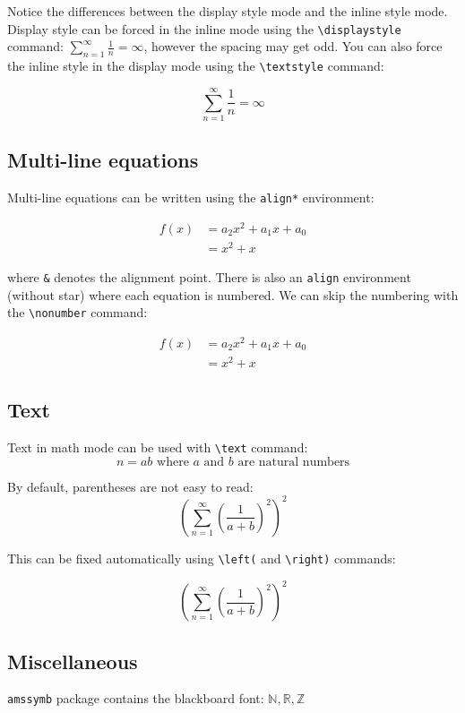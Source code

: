 \documentclass[a4paper]{article}
\newcommand{\sign}[1]{\texttt{\textbackslash{#1}}}
\begin{document}
Notice the differences between the display style mode and the inline style mode. Display style can be forced in the inline mode using the \sign{displaystyle} command: \( \displaystyle \sum_{n=1}^\infty \frac{1}{n} = \infty \), however the spacing may get odd. You can also force the inline style in the display mode using the \sign{textstyle} command:

$$
\textstyle
\sum_{n=1}^\infty \frac{1}{n} = \infty
$$

\subsection{Multi-line equations}

Multi-line equations can be written using the \texttt{align*} environment: 

\begin{align*}
    f(x) & = a_2x^2 + a_1x+ a_0 \\
         & = x^2 + x
\end{align*}

where \texttt{\&} denotes the alignment point. There is also an \texttt{align} environment (without star) where each equation is numbered. We can skip the numbering with the \sign{nonumber} command:

\begin{align}
    f(x) & = a_2x^2 + a_1x+ a_0 \\
         & = x^2 + x \nonumber
\end{align}

\subsection{Text}

Text in math mode can be used with \sign{text\string{\string}} command: 
$$
n = ab \text{ where $a$ and $b$ are natural numbers}
$$


By default, parentheses are not easy to read: 
$$
(\sum_{n=1}^\infty (\frac{1}{a+b})^2)^2
$$

This can be fixed automatically using \sign{left(} and \sign{right)} commands:

$$
\left(\sum_{n=1}^\infty \left(\frac{1}{a+b}\right)^2\right)^2
$$

\subsection{Miscellaneous}

\texttt{amssymb} package contains the blackboard font: 
$\mathbb{N}, \mathbb{R}, \mathbb{Z}$
\end{document}
